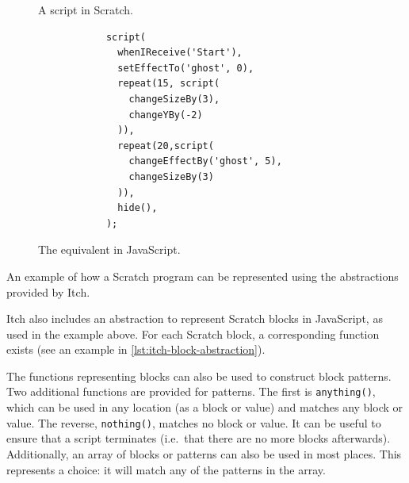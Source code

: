 \documentclass[../main]{subfiles}
\begin{document}
\begin{listing}
    \begin{wide}
        \begin{subfigure}{0.49\linewidth}
            \begin{scratch}[scale=0.8]
                {
                }
                {
                }

            \end{scratch}
            \caption{A script in Scratch.}
        \end{subfigure}
        \begin{subfigure}{0.5\linewidth}
            \begin{verbatim}
            script(
              whenIReceive('Start'),
              setEffectTo('ghost', 0),
              repeat(15, script(
                changeSizeBy(3),
                changeYBy(-2)
              )),
              repeat(20,script(
                changeEffectBy('ghost', 5),
                changeSizeBy(3)
              )),
              hide(),
            );
            \end{verbatim}
            \caption{The equivalent in JavaScript.}
        \end{subfigure}
    \end{wide}
    \caption{An example of how a Scratch program can be represented using the abstractions provided by Itch.}\label{lst:itch-block-abstraction}
\end{listing}

Itch also includes an abstraction to represent Scratch blocks in JavaScript, as used in the example above.
For each Scratch block, a corresponding function exists (see an example in \cref{lst:itch-block-abstraction}).

The functions representing blocks can also be used to construct block patterns.
Two additional functions are provided for patterns.
The first is \texttt{anything()}, which can be used in any location (as a block or value) and matches any block or value.
The reverse, \texttt{nothing()}, matches no block or value.
It can be useful to ensure that a script terminates (i.e.\ that there are no more blocks afterwards).
Additionally, an array of blocks or patterns can also be used in most places.
This represents a choice: it will match any of the patterns in the array.
\end{document}
